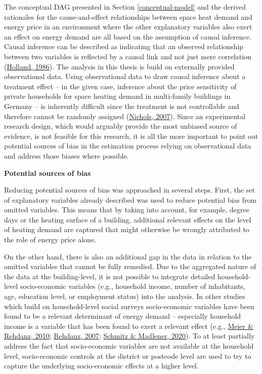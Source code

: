 \documentclass[12pt,twoside]{reedthesis}
\begin{document}
The conceptual DAG presented in Section \ref{conceptual-model} and the derived rationales for the cause-and-effect relationships between space heat demand and energy price in an environment where the other explanatory variables also exert an effect on energy demand are all based on the assumption of causal inference. Causal inference can be described as indicating that an observed relationship between two variables is reflected by a causal link and not just mere correlation (\protect\hyperlink{ref-holland86}{Holland, 1986}). The analysis in this thesis is build on externally provided observational data. Using observational data to draw causal inference about a treatment effect -- in the given case, inference about the price sensitivity of private households for space heating demand in multi-family buildings in Germany -- is inherently difficult since the treatment is not controllable and therefore cannot be randomly assigned (\protect\hyperlink{ref-nichols07}{Nichols, 2007}). Since an experimental research design, which would arguably provide the most unbiased source of evidence, is not feasible for this research, it is all the more important to point out potential sources of bias in the estimation process relying on observational data and address those biases where possible.

\textbf{Potential sources of bias}

Reducing potential sources of bias was approached in several steps. First, the set of explanatory variables already described was used to reduce potential bias from omitted variables. This means that by taking into account, for example, degree days or the heating surface of a building, additional relevant effects on the level of heating demand are captured that might otherwise be wrongly attributed to the role of energy price alone.

On the other hand, there is also an additional gap in the data in relation to the omitted variables that cannot be fully remedied. Due to the aggregated nature of the data at the building-level, it is not possible to integrate detailed household-level socio-economic variables (e.g., household income, number of inhabitants, age, education level, or employment status) into the analysis. In other studies which build on household-level social surveys socio-economic variables have been found to be a relevant determinant of energy demand -- especially household income is a variable that has been found to exert a relevant effect (e.g., \protect\hyperlink{ref-meier_rehdanz10}{Meier \& Rehdanz, 2010}; \protect\hyperlink{ref-rehdanz07}{Rehdanz, 2007}; \protect\hyperlink{ref-schmitz_madlener20}{Schmitz \& Madlener, 2020}). To at least partially address the fact that socio-economic variables are not available at the household level, socio-economic controls at the district or postcode level are used to try to capture the underlying socio-economic effects at a higher level.
\end{document}
